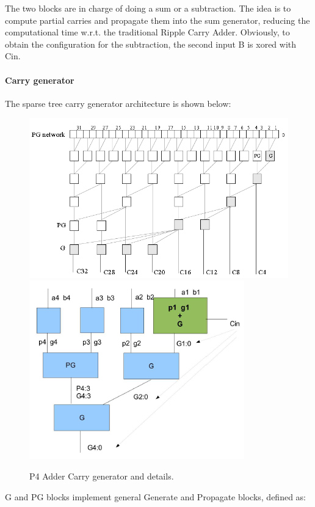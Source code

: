 The two blocks are in charge of doing a sum or a subtraction. The idea is to compute partial carries and propagate them into the sum 
generator, reducing the computational time w.r.t. the traditional Ripple Carry Adder. Obviously, to obtain the configuration for the subtraction,
the second input B is xored with Cin.\\
\paragraph{Carry generator}
The sparse tree carry generator architecture is shown below:

\begin{figure}[h]
\centering
\includegraphics[scale = 0.3]{chapters/figures/sparsetree} 
\includegraphics[scale = 0.5]{chapters/figures/sparsetreedetails} 
\caption{P4 Adder Carry generator and details.}
\label{fig:sparsetree}  %
\end{figure}

G and PG blocks implement general Generate and Propagate blocks, defined as:

